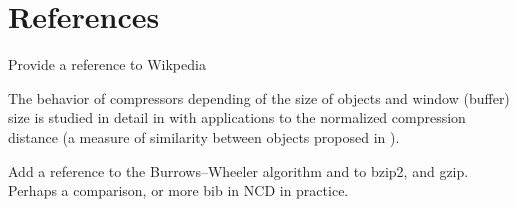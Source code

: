 %
%
\section*{References}

{\color{red} Provide a reference to Wikpedia}

The behavior of compressors depending of the size of objects and window (buffer) size is studied in detail in \cite{cebrian2005common} with applications to the normalized compression distance (a measure of similarity between objects proposed in \cite{li2004similarity}).

Add a reference to the Burrows–Wheeler algorithm and to bzip2, and gzip. Perhaps a comparison, or more bib in NCD in practice.

% 
% 
%
% 
% 
% 
% 
% 
% 
% 
% 



